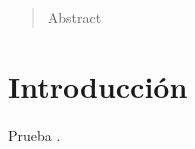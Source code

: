 \documentclass[10pt, a4paper,spanish]{article}
\begin{document}
	\maketitle %

	\thispagestyle{fancy} %



	\begin{abstract}
		\noindent Abstract
	\end{abstract}



  \section{Introducción}

    \paragraph{}
		Prueba \cite{subject:taa}.



  
  
\end{document}
